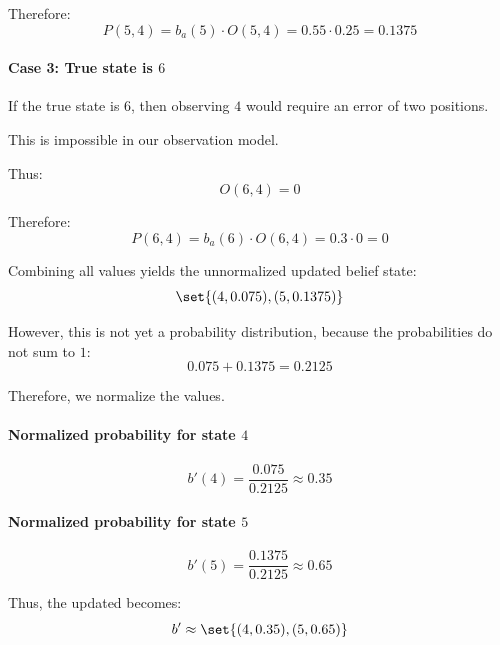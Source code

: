 Therefore:
\[
P(5,4)
=
b_a(5)\cdot O(5,4)
=
0.55\cdot 0.25
=
0.1375
\]

\paragraph{Case 3: True state is $6$}

If the true state is $6$, then observing $4$ would require an error of two positions.

This is impossible in our observation model.

Thus:
\[
O(6,4)=0
\]

Therefore:
\[
P(6,4)
=
b_a(6)\cdot O(6,4)
=
0.3\cdot 0
=
0
\]

Combining all values yields the unnormalized updated belief state:
\[
\set{
(4,0.075),
(5,0.1375)
}
\]

However, this is not yet a probability distribution, because the probabilities do not sum to $1$:
\[
0.075+0.1375=0.2125
\]

Therefore, we normalize the values.

\paragraph{Normalized probability for state $4$}

\[
b'(4)
=
\frac{0.075}{0.2125}
\approx
0.35
\]

\paragraph{Normalized probability for state $5$}

\[
b'(5)
=
\frac{0.1375}{0.2125}
\approx
0.65
\]

Thus, the updated  becomes:
\[
b'
\approx
\set{
(4,0.35),
(5,0.65)
}
\]






